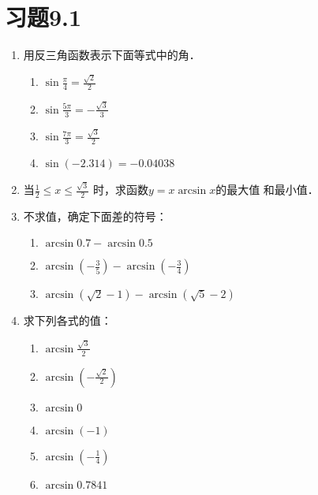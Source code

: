\section*{习题9.1}
\begin{enumerate}
    \item 用反三角函数表示下面等式中的角．
    \begin{multicols}{2}
\begin{enumerate}
    \item $\sin\frac{\pi}{4}=\frac{\sqrt{2}}{2}$
    \item $\sin\frac{5\pi}{3}=-\frac{\sqrt{3}}{3}$
    \item $\sin\frac{7\pi}{3}=\frac{\sqrt{3}}{2}$
    \item $\sin(-2.314)=-0.04038$
\end{enumerate}
    \end{multicols}
    \item 当$\frac{1}{2}\le x\le\frac{\sqrt{3}}{2}$
    时，求函数$y=x\arcsin x$的最大值
    和最小值．
    \item 不求值，确定下面差的符号：
\begin{enumerate}
    \item $\arcsin 0.7-\arcsin 0.5$
    \item $\arcsin\left(-\frac{3}{5}\right)-\arcsin\left(-\frac{3}{4}\right)$
    \item $\arcsin\left(\sqrt{2}-1\right)-\arcsin\left(\sqrt{5}-2\right)$
\end{enumerate}
\item 求下列各式的值：
\begin{multicols}{2}
\begin{enumerate}
    \item $\arcsin\frac{\sqrt{3}}{2}$
    \item $\arcsin\left(-\frac{\sqrt{2}}{2}\right)$
    \item $\arcsin0$
    \item $\arcsin(-1)$
    \item $\arcsin\left(-\frac{1}{4}\right)$
    \item $\arcsin0.7841$
\end{enumerate}
\end{multicols}


\end{enumerate}
